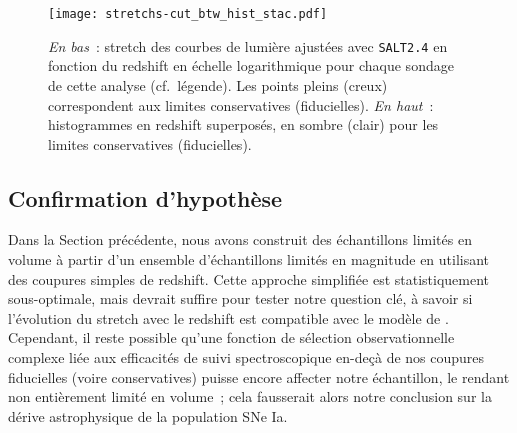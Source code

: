 \documentclass[../main/main.tex]{subfiles}
\begin{document}
\begin{figure}
    \centering
    \texttt{[image: stretchs-cut\_btw\_hist\_stac.pdf]}
    \caption[Présentation des données de stretch en fonction du
    redshift.]{\textit{En bas}~: stretch des courbes de lumière ajustées avec
        \textsc{\texttt{SALT2.4}} en fonction du redshift en échelle
        logarithmique pour chaque sondage de cette analyse (cf.~légende). Les
        points pleins (creux) correspondent aux limites conservatives
        (fiducielles). \textit{En haut}~: histogrammes en redshift superposés,
        en sombre (clair) pour les limites conservatives
    (fiducielles).}\label{fig:sample}
\end{figure}

\subsection{Confirmation d'hypothèse}\label{ssec:testvl}

% 

Dans la Section précédente, nous avons construit des échantillons limités en
volume à partir d'un ensemble d'échantillons limités en magnitude en utilisant
des coupures simples de redshift. Cette approche simplifiée est
statistiquement sous-optimale, mais devrait suffire pour tester notre question
clé, à savoir si l'évolution du stretch avec le redshift est compatible avec le
modèle de \cite{rigault2020}. Cependant, il reste possible qu'une fonction de
sélection observationnelle complexe liée aux efficacités de suivi
spectroscopique en-deçà de nos coupures fiducielles (voire conservatives) puisse
encore affecter notre échantillon, le rendant non entièrement limité en volume~;
cela fausserait alors notre conclusion sur la dérive astrophysique de la
population SNe Ia.
\end{document}

